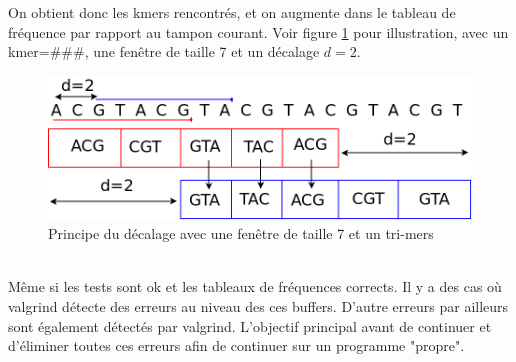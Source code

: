 On obtient donc les kmers rencontrés, et on augmente dans le tableau de fréquence par rapport au tampon courant. Voir figure \ref{decalage} pour illustration, avec un kmer=\#\#\#, une fenêtre de taille 7 et un décalage $d=2$.

\begin{figure}[H]
\begin{center}
\includegraphics[scale=0.4]{./../img/decalage.png}
\caption[Principe du décalage]{\label{decalage}Principe du décalage avec une fenêtre de taille 7 et un tri-mers}
\end{center}
\end{figure}
~\\

Même si les tests sont ok et les tableaux de fréquences corrects. Il y a des cas où valgrind détecte des erreurs au niveau des ces buffers. D'autre erreurs par ailleurs sont également détectés par valgrind. L'objectif principal avant de continuer et d'éliminer toutes ces erreurs afin de continuer sur un programme "propre".
